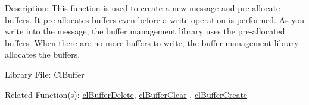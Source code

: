 \begin{Desc}
\item[Description:]This function is used to create a new message and pre-allocate buffers. It pre-allocates buffers even before a write 
operation is performed. As you write into the message, the buffer management library uses the pre-allocated buffers. When there are no more buffers 
to write, the buffer management library allocates the buffers.\end{Desc}
\begin{Desc}
\item[Library File:]Cl\-Buffer\end{Desc}
\begin{Desc}
\item[Related Function(s):]\hyperlink{pagebuf105}{cl\-Buffer\-Delete}, \hyperlink{pagebuf106}{cl\-Buffer\-Clear} , 
\hyperlink{pagebuf103}{cl\-Buffer\-Create} \end{Desc}


\newpage
